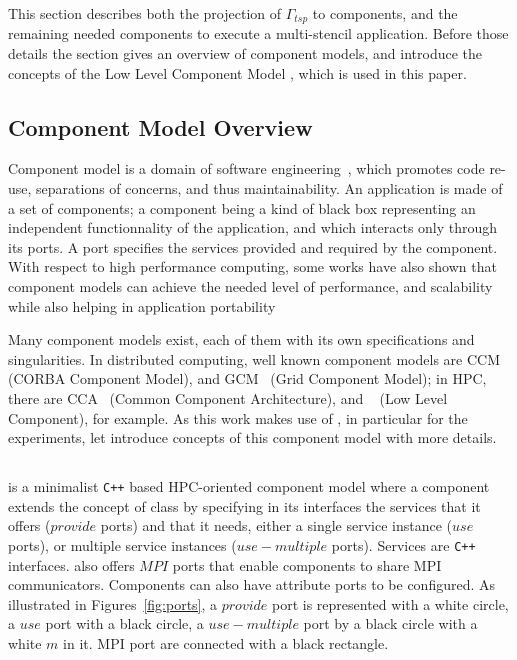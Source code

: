 This section describes both the projection of $\Gamma_{tsp}$ to
components, and the remaining needed components to execute a
multi-stencil application. Before those details the section gives an overview of
component models, and introduce the concepts of the Low Level Component Model \llc, which is used in this paper.


\subsection{Component Model Overview}
Component model is a domain of software
engineering~\cite{Szyperski:2002:CSB:515228}, which promotes code
re-use, separations of concerns, and thus maintainability. An
application is made of a set of components; a component being a kind of
black box representing an independent functionnality of the application, and which interacts only through its ports. A port specifies the services provided and required by the component.
%
With respect to high performance computing, some works have also shown
that component models can achieve the needed level of performance, and
scalability while also helping in application
portability~\cite{Bernholdt01052006, bigot:inria-00388508, UCHPC2015}

Many component models exist, each of them with its own specifications
and singularities. In distributed computing, well known component
models are CCM~\cite{corba:omg06} (CORBA Component Model), and
GCM~\cite{Baude} (Grid Component Model); in HPC, there are
CCA~\cite{Bernholdt01052006} (Common Component Architecture), and
\llc~\cite{l2c} (Low Level Component), for example.
%
As this work makes use of \llc, in particular for the experiments, let
introduce concepts of this component model with more details.

\subsection{\llc}

\llc is a minimalist \texttt{C++} based HPC-oriented component model
where a component extends the concept of class by specifying in its
interfaces the services that it offers ($provide$ ports) and that it
needs, either a single service instance ($use$ ports), or multiple
service instances ($use-multiple$ ports). Services are \texttt{C++}
interfaces. \llc also offers $MPI$ ports that enable components to
share MPI communicators. Components can also have attribute ports to
be configured.
%
As illustrated in Figures~\ref{fig:ports}, a $provide$ port is
represented with a white circle, a $use$
port with a black circle, a $use-multiple$ port by a black circle with
a white $m$ in it. MPI port are
connected with a black rectangle.

